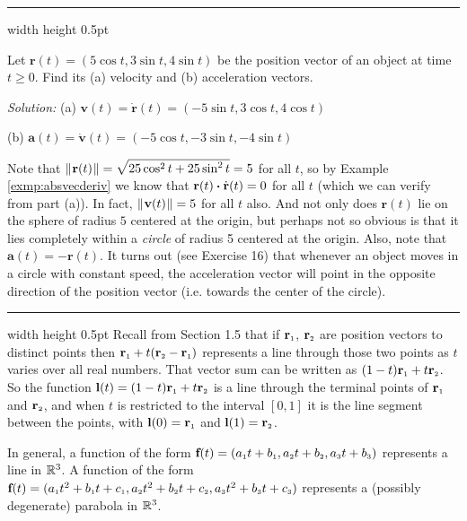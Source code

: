 \vspace{2mm}
\hrule width \textwidth height 0.5pt
\begin{exmp}
 Let $\textbf{r}(t) = (5 \cos t , 3 \sin t , 4 \sin t )$ be the position vector of an object at time $t \ge 0$. Find
 its (a) velocity and (b) acceleration vectors.\vspace{1mm}
 \par\noindent \emph{Solution:} (a) $\textbf{v}(t) = \dot{\textbf{r}}(t) = (-5 \sin t , 3 \cos t ,
 4 \cos t )$\vspace{1mm}
 \par\noindent (b) $\textbf{a}(t) = \dot{\textbf{v}}(t) = (-5 \cos t , -3 \sin t , -4 \sin t )$\vspace{1mm}
 
 \par\noindent Note that $\lVert\mspace{1mu}\textbf{r}(t)\mspace{1mu}\rVert = \sqrt{25 \cos^2 t + 25 \sin^2 t} = 5$ for all $t$, so by Example
 \ref{exmp:absvecderiv} we know that $\textbf{r}(t) \bm{\cdot} \dot{\textbf{r}}(t) = 0$ for all $t$ (which we can verify
 from part (a)). In fact, $\lVert\mspace{1mu}\textbf{v}(t)\mspace{1mu}\rVert = 5$ for all $t$ also. And not only does $\textbf{r}(t)$ lie on the
 sphere of radius $5$ centered at the origin, but perhaps not so obvious is that it lies completely within a
 \emph{circle} of radius 5 centered at the origin. Also, note that $\textbf{a}(t) = -\textbf{r}(t)$. It turns out (see
 Exercise 16) that whenever an object moves in a circle with constant speed, the acceleration vector will point in the
 opposite direction of the position vector (i.e. towards the center of the circle).
\end{exmp}
\hrule width \textwidth height 0.5pt
\newpage
Recall from Section 1.5 that if $\textbf{r}_{\scriptscriptstyle 1}$, $\textbf{r}_{\scriptscriptstyle 2}$ are position vectors to distinct points
then $\textbf{r}_{\scriptscriptstyle 1} + t (\textbf{r}_{\scriptscriptstyle 2} - \textbf{r}_{\scriptscriptstyle 1})$ represents a line through those two
points as $t$ varies over all real numbers. That vector sum can be written as $(1 - t) \textbf{r}_{\scriptscriptstyle 1} +
t \textbf{r}_{\scriptscriptstyle 2}$. So the function $\textbf{l}(t) = (1 - t) \textbf{r}_{\scriptscriptstyle 1} +
t \textbf{r}_{\scriptscriptstyle 2}$ is a line through the terminal points of $\textbf{r}_{\scriptscriptstyle 1}$ and $\textbf{r}_{\scriptscriptstyle 2}$, and
when $t$ is restricted to the interval $\left[ 0,1 \right]$ it is the line segment between the points, with
$\textbf{l}(0) = \textbf{r}_{\scriptscriptstyle 1}$ and $\textbf{l}(1) = \textbf{r}_{\scriptscriptstyle 2}$.

In general, a function of the form
$\textbf{f}(t) = (a_{\scriptscriptstyle 1}t + b_{\scriptscriptstyle 1},a_{\scriptscriptstyle 2}t + b_{\scriptscriptstyle 2},a_{\scriptscriptstyle 3}t + b_{\scriptscriptstyle 3})$ represents a line
in $\mathbb{R}^{3}$. A function of the form
$\textbf{f}(t) = (a_{\scriptscriptstyle 1}t^2 + b_{\scriptscriptstyle 1}t + c_{\scriptscriptstyle 1},a_{\scriptscriptstyle 2}t^2 + b_{\scriptscriptstyle 2}t + c_{\scriptscriptstyle 2},
a_{\scriptscriptstyle 3}t^2 + b_{\scriptscriptstyle 3}t + c_{\scriptscriptstyle 3})$ represents a (possibly degenerate) parabola in $\mathbb{R}^{3}$.

